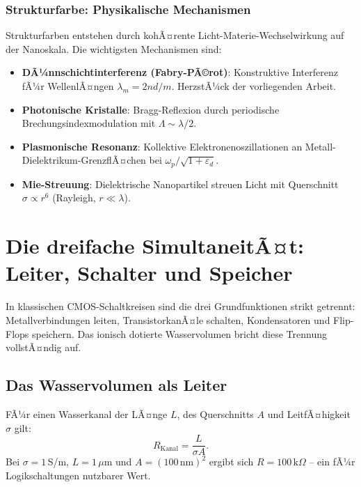 ﻿\documentclass[a4paper,12pt]{scrreprt}
\theoremstyle{definition}
\begin{document}
\subsubsection{Strukturfarbe: Physikalische Mechanismen}

Strukturfarben entstehen durch kohÃ¤rente Licht-Materie-Wechselwirkung auf
der Nanoskala. Die wichtigsten Mechanismen sind:
\begin{itemize}
  \item \textbf{DÃ¼nnschichtinterferenz (Fabry-PÃ©rot)}: Konstruktive Interferenz
    fÃ¼r WellenlÃ¤ngen $\lambda_m = 2nd/m$. HerzstÃ¼ck der vorliegenden Arbeit.
  \item \textbf{Photonische Kristalle}: Bragg-Reflexion durch periodische
    Brechungsindexmodulation mit $\Lambda \sim \lambda/2$.
  \item \textbf{Plasmonische Resonanz}: Kollektive Elektronenoszillationen an
    Metall-Dielektrikum-GrenzflÃ¤chen bei $\omega_p/\sqrt{1 + \varepsilon_d}$.
  \item \textbf{Mie-Streuung}: Dielektrische Nanopartikel streuen Licht mit
    Querschnitt $\sigma \propto r^6$ (Rayleigh, $r \ll \lambda$).
\end{itemize}

\section{Die dreifache SimultaneitÃ¤t: Leiter, Schalter und Speicher}

In klassischen CMOS-Schaltkreisen sind die drei Grundfunktionen strikt getrennt:
Metallverbindungen leiten, TransistorkanÃ¤le schalten, Kondensatoren und
Flip-Flops speichern. Das ionisch dotierte Wasservolumen bricht diese Trennung
vollstÃ¤ndig auf.

\subsection{Das Wasservolumen als Leiter}

FÃ¼r einen Wasserkanal der LÃ¤nge $L$, des Querschnitts $A$ und LeitfÃ¤higkeit
$\sigma$ gilt:
\begin{equation}
  R_{\mathrm{Kanal}} = \frac{L}{\sigma A}.
\end{equation}
Bei $\sigma = 1$\,S/m, $L = 1\,\mu$m und $A = (100\,\text{nm})^2$ ergibt
sich $R = 100\,\text{k}\Omega$ -- ein fÃ¼r Logikschaltungen nutzbarer Wert.
\end{document}
